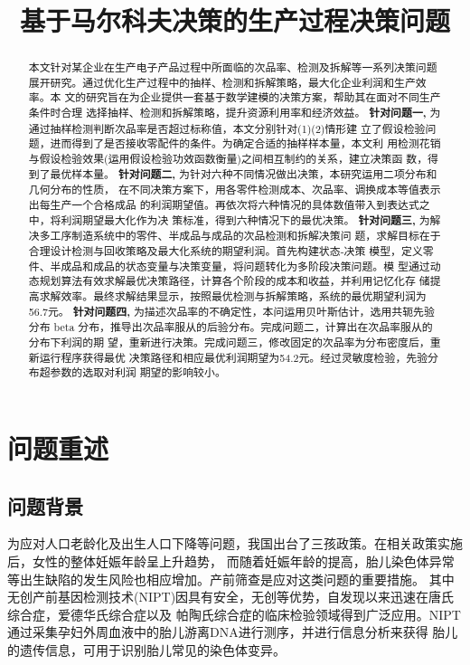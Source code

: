 \documentclass[withoutpreface,notoc]{cumcmthesis}
\title{基于马尔科夫决策的生产过程决策问题} %
\begin{document}
	\maketitle
	\begin{abstract}
		本文针对某企业在生产电子产品过程中所面临的次品率、检测及拆解等一系列决策问题
展开研究。通过优化生产过程中的抽样、检测和拆解策略，最大化企业利润和生产效率。本
文的研究旨在为企业提供一套基于数学建模的决策方案，帮助其在面对不同生产条件时合理
选择抽样、检测和拆解策略，提升资源利用率和经济效益。
		\textbf{针对问题一,} 为通过抽样检测判断次品率是否超过标称值，本文分别针对(1)(2)情形建
立了假设检验问题，进而得到了是否接收零配件的条件。为确定合适的抽样样本量，本文利
用检测花销与假设检验效果(运用假设检验功效函数衡量)之间相互制约的关系，建立决策函
数，得到了最优样本量。
		\textbf{针对问题二,} 为针对六种不同情况做出决策，本研究运用二项分布和几何分布的性质，
在不同决策方案下，用各零件检测成本、次品率、调换成本等值表示出每生产一个合格成品
的利润期望值。再依次将六种情况的具体数值带入到表达式之中，将利润期望最大化作为决
策标准，得到六种情况下的最优决策。
		\textbf{针对问题三,} 为解决多工序制造系统中的零件、半成品与成品的次品检测和拆解决策问
题，求解目标在于合理设计检测与回收策略及最大化系统的期望利润。首先构建状态-决策
模型，定义零件、半成品和成品的状态变量与决策变量，将问题转化为多阶段决策问题。模
型通过动态规划算法有效求解最优决策路径，计算各个阶段的成本和收益，并利用记忆化存
储提高求解效率。最终求解结果显示，按照最优检测与拆解策略，系统的最优期望利润为
56.7元。
		\textbf{针对问题四,} 为描述次品率的不确定性，本问运用贝叶斯估计，选用共轭先验分布 beta
分布，推导出次品率服从的后验分布。完成问题二，计算出在次品率服从的分布下利润的期
望，重新进行决策。完成问题三，修改固定的次品率为分布密度后，重新运行程序获得最优
决策路径和相应最优利润期望为54.2元。经过灵敏度检验，先验分布超参数的选取对利润
期望的影响较小。
		
	\end{abstract}
	
	
	\section{问题重述}

	\subsection{问题背景}
	为应对人口老龄化及出生人口下降等问题，我国出台了三孩政策。在相关政策实施后，女性的整体妊娠年龄呈上升趋势，
	而随着妊娠年龄的提高，胎儿染色体异常等出生缺陷的发生风险也相应增加。产前筛查是应对这类问题的重要措施。
	其中无创产前基因检测技术(NIPT)因具有安全，无创等优势，自发现以来迅速在唐氏综合症，爱德华氏综合症以及
	帕陶氏综合症的临床检验领域得到广泛应用。NIPT通过采集孕妇外周血液中的胎儿游离DNA进行测序，并进行信息分析来获得
	胎儿的遗传信息，可用于识别胎儿常见的染色体变异。
\end{document}
